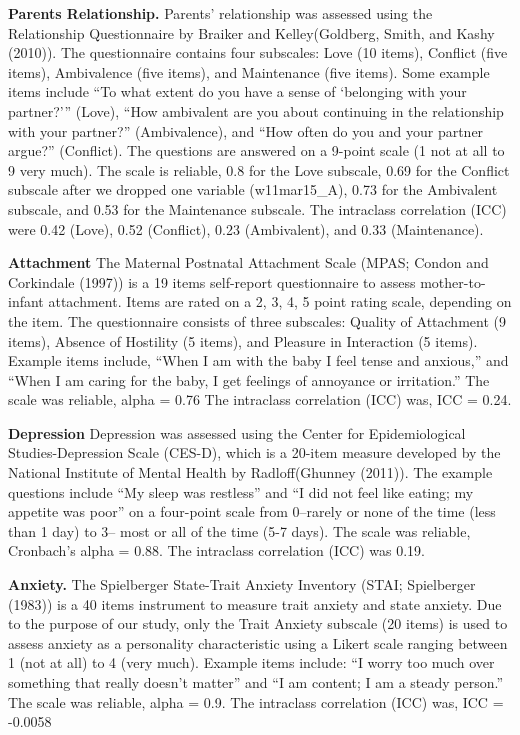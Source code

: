 \documentclass[man]{apa6}
\begin{document}
\textbf{Parents Relationship.}
Parents' relationship was assessed using the Relationship Questionnaire by Braiker and Kelley(Goldberg, Smith, and Kashy (2010)). The questionnaire contains four subscales: Love (10 items), Conflict (five items), Ambivalence (five items), and Maintenance (five items). Some example items include \enquote{To what extent do you have a sense of \enquote{belonging with your partner?}} (Love), \enquote{How ambivalent are you about continuing in the relationship with your partner?} (Ambivalence), and \enquote{How often do you and your partner argue?} (Conflict). The questions are answered on a 9-point scale (1 not at all to 9 very much). The scale is reliable, 0.8 for the Love subscale, 0.69 for the Conflict subscale after we dropped one variable (w11mar15\_A), 0.73 for the Ambivalent subscale, and 0.53 for the Maintenance subscale. The intraclass correlation (ICC) were 0.42 (Love), 0.52 (Conflict), 0.23 (Ambivalent), and 0.33 (Maintenance).

\textbf{Attachment}
The Maternal Postnatal Attachment Scale (MPAS; Condon and Corkindale (1997)) is a 19 items self-report questionnaire to assess mother-to-infant attachment. Items are rated on a 2, 3, 4, 5 point rating scale, depending on the item. The questionnaire consists of three subscales: Quality of Attachment (9 items), Absence of Hostility (5 items), and Pleasure in Interaction (5 items). Example items include, \enquote{When I am with the baby I feel tense and anxious,} and \enquote{When I am caring for the baby, I get feelings of annoyance or irritation.} The scale was reliable, alpha = 0.76 The intraclass correlation (ICC) was, ICC = 0.24.

\textbf{Depression}
Depression was assessed using the Center for Epidemiological Studies-Depression Scale (CES-D), which is a 20-item measure developed by the National Institute of Mental Health by Radloff(Ghunney (2011)). The example questions include \enquote{My sleep was restless} and \enquote{I did not feel like eating; my appetite was poor} on a four-point scale from 0--rarely or none of the time (less than 1 day) to 3-- most or all of the time (5-7 days). The scale was reliable, Cronbach's alpha = 0.88. The intraclass correlation (ICC) was 0.19.

\textbf{Anxiety.}
The Spielberger State-Trait Anxiety Inventory (STAI; Spielberger (1983)) is a 40 items instrument to measure trait anxiety and state anxiety. Due to the purpose of our study, only the Trait Anxiety subscale (20 items) is used to assess anxiety as a personality characteristic using a Likert scale ranging between 1 (not at all) to 4 (very much). Example items include: \enquote{I worry too much over something that really doesn't matter} and \enquote{I am content; I am a steady person.} The scale was reliable, alpha = 0.9. The intraclass correlation (ICC) was, ICC = -0.0058
\end{document}
